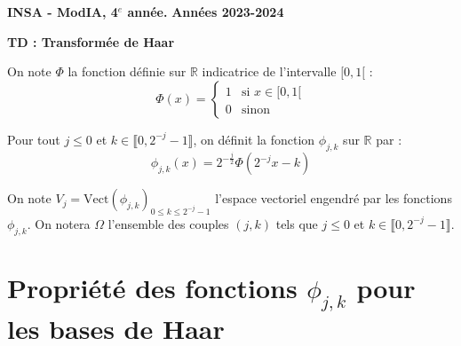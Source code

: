 \documentclass[12pt,a4paper]{article}
\newcommand{\entete}{
    \noindent\textbf{INSA - ModIA, 4$^e$ année.}
    \hfill \textbf{Années 2023-2024}
    
    \begin{center}
        \textbf{\LARGE TD : Transformée de Haar}
    \end{center}
}
\begin{document}
\entete

\vspace{0.5cm}


On note $\Phi$ la fonction définie sur $\mathbb{R}$ indicatrice de l'intervalle $[0,1[$ :
$$
\Phi(x) = \begin{cases}
1 & \text{si } x \in [0,1[ \\
0 & \text{sinon}
\end{cases}
$$

Pour tout $j \leq 0$ et $k \in \llbracket 0, 2^{-j} - 1 \rrbracket$, on définit la fonction $\phi_{j,k}$ sur $\mathbb{R}$ par :
$$
\phi_{j,k}(x) = 2^{-\frac{j}{2}} \Phi(2^{-j} x - k)
$$

On note $V_j = \text{Vect}(\phi_{j,k})_{0 \leq k \leq 2^{-j} - 1}$ l'espace vectoriel engendré par les fonctions $\phi_{j,k}$.
On notera $\Omega$ l'ensemble des couples $(j,k)$ tels que $j \leq 0$ et $k \in \llbracket 0, 2^{-j} - 1 \rrbracket$.


\section{Propriété des fonctions $\phi_{j,k}$ pour les bases de Haar}
\end{document}
